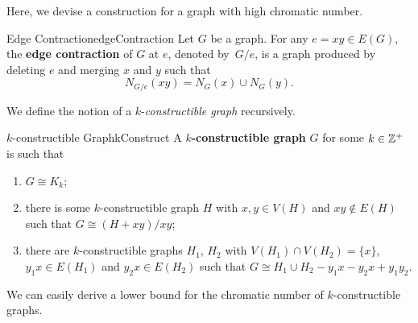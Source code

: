 \documentclass[math]{amznotes}
\theoremstyle{remark}
\begin{document}
Here, we devise a construction for a graph with high chromatic number.
\begin{dfnbox}{Edge Contraction}{edgeContraction}
    Let $G$ be a graph. For any $e = xy \in E(G)$, the {\color{red} \textbf{edge contraction}} of $G$ at $e$, denoted by~$G/e$, is a graph produced by deleting $e$ and merging $x$ and $y$ such that 
    \begin{equation*}
        N_{G/e}(xy) = N_G(x) \cup N_G(y).
    \end{equation*}
\end{dfnbox}
We define the notion of a $k$-\textit{constructible graph} recursively.
\begin{dfnbox}{$k$-constructible Graph}{kConstruct}
    A {\color{red} \textbf{$k$-constructible graph}} $G$ for some $k \in \mathbb{Z}^+$ is such that 
    \begin{enumerate}
        \item $G \cong K_k$;
        \item there is some $k$-constructible graph $H$ with $x, y \in V(H)$ and $xy \notin E(H)$ such that $G \cong (H + xy)/xy$;
        \item there are $k$-constructible graphs $H_1$, $H_2$ with $V(H_1) \cap V(H_2) = \{x\}$, $y_1x \in E(H_1)$ and $y_2x \in E(H_2)$ such that $G \cong H_1 \cup H_2 - y_1x - y_2x + y_1y_2$.
    \end{enumerate}
\end{dfnbox}
We can easily derive a lower bound for the chromatic number of $k$-constructible graphs.
\end{document}
